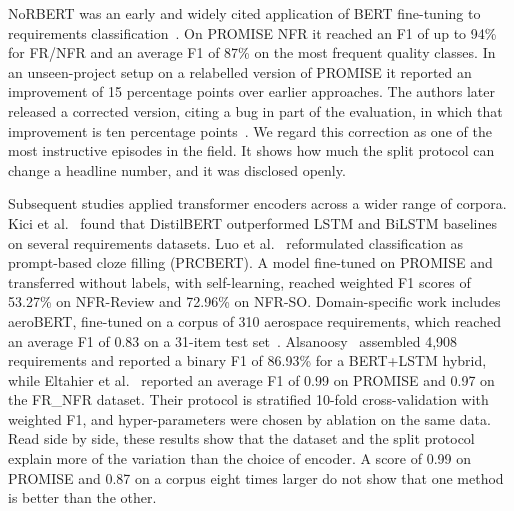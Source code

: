 \documentclass[conference,10pt,letterpaper]{IEEEtran}
\begin{document}
NoRBERT was an early and widely cited application of BERT fine-tuning to requirements classification~\cite{hey2020norbert}. On PROMISE NFR it reached an F1 of up to 94\% for FR/NFR and an average F1 of 87\% on the most frequent quality classes. In an unseen-project setup on a relabelled version of PROMISE it reported an improvement of 15 percentage points over earlier approaches. The authors later released a corrected version, citing a bug in part of the evaluation, in which that improvement is ten percentage points~\cite{hey2022corrected}. We regard this correction as one of the most instructive episodes in the field. It shows how much the split protocol can change a headline number, and it was disclosed openly.

Subsequent studies applied transformer encoders across a wider range of corpora. Kici et al.~\cite{kici2021} found that DistilBERT outperformed LSTM and BiLSTM baselines on several requirements datasets. Luo et al.~\cite{luo2022prcbert} reformulated classification as prompt-based cloze filling (PRCBERT). A model fine-tuned on PROMISE and transferred without labels, with self-learning, reached weighted F1 scores of 53.27\% on NFR-Review and 72.96\% on NFR-SO. Domain-specific work includes aeroBERT, fine-tuned on a corpus of 310 aerospace requirements, which reached an average F1 of 0.83 on a 31-item test set~\cite{tikayatray2023}. Alsanoosy~\cite{alsanoosy2026} assembled 4,908 requirements and reported a binary F1 of 86.93\% for a BERT+LSTM hybrid, while Eltahier et al.~\cite{eltahier2025} reported an average F1 of 0.99 on PROMISE and 0.97 on the FR\_NFR dataset. Their protocol is stratified 10-fold cross-validation with weighted F1, and hyper-parameters were chosen by ablation on the same data. Read side by side, these results show that the dataset and the split protocol explain more of the variation than the choice of encoder. A score of 0.99 on PROMISE and 0.87 on a corpus eight times larger do not show that one method is better than the other.
\end{document}
